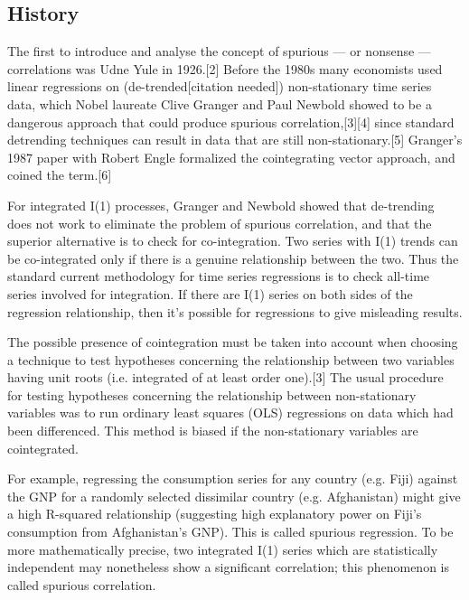 \subsection*{History}
The first to introduce and analyse the concept of spurious — or nonsense — correlations was Udne Yule in 1926.[2] Before the 1980s many economists used linear regressions on (de-trended[citation needed]) non-stationary time series data, which Nobel laureate Clive Granger and Paul Newbold showed to be a dangerous approach that could produce spurious correlation,[3][4] since standard detrending techniques can result in data that are still non-stationary.[5] Granger's 1987 paper with Robert Engle formalized the cointegrating vector approach, and coined the term.[6]

For integrated I(1) processes, Granger and Newbold showed that de-trending does not work to eliminate the problem of spurious correlation, and that the superior alternative is to check for co-integration. Two series with I(1) trends can be co-integrated only if there is a genuine relationship between the two. Thus the standard current methodology for time series regressions is to check all-time series involved for integration. If there are I(1) series on both sides of the regression relationship, then it's possible for regressions to give misleading results.

The possible presence of cointegration must be taken into account when choosing a technique to test hypotheses concerning the relationship between two variables having unit roots (i.e. integrated of at least order one).[3] The usual procedure for testing hypotheses concerning the relationship between non-stationary variables was to run ordinary least squares (OLS) regressions on data which had been differenced. This method is biased if the non-stationary variables are cointegrated.

For example, regressing the consumption series for any country (e.g. Fiji) against the GNP for a randomly selected dissimilar country (e.g. Afghanistan) might give a high R-squared relationship (suggesting high explanatory power on Fiji's consumption from Afghanistan's GNP). This is called spurious regression. To be more mathematically precise, two integrated I(1) series which are statistically independent may nonetheless show a significant correlation; this phenomenon is called spurious correlation.



